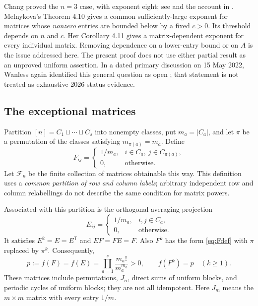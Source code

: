 \documentclass[11pt]{article}
\theoremstyle{remark}\newtheorem{remark}[theorem]{Remark}
\newcommand{\Fset}{\mathcal F_n}
\begin{document}
Chang proved the $n=3$ case, with exponent eight; see \cite{Chang90} and
the account in \cite{Mel}. Melnykova's Theorem 4.10 gives a common
sufficiently-large exponent for matrices whose \emph{nonzero} entries
are bounded below by a fixed $c>0$. Its threshold depends on $n$ and $c$.
Her Corollary 4.11 gives a matrix-dependent exponent for every individual
matrix. Removing dependence on a lower-entry bound or on $A$ is the
issue addressed here. The present proof does not use either partial
result as an unproved uniform assertion. In a dated primary discussion
on 15 May 2022, Wanless again identified this general question as open
\cite{MO}; that statement is not treated as exhaustive 2026 status evidence.

\subsection{The exceptional matrices}
Partition $[n]=C_1\sqcup\cdots\sqcup C_s$ into nonempty classes, put
$m_a=|C_a|$, and let $\pi$ be a permutation of the classes satisfying
$m_{\pi(a)}=m_a$. Define
\begin{equation}\label{eq:Fdef}
 F_{ij}=\begin{cases}1/m_a,&i\in C_a,\ j\in C_{\pi(a)},\\
 0,&\text{otherwise}.
 \end{cases}
\end{equation}
Let $\Fset$ be the finite collection of matrices obtainable this way.
This definition uses a \emph{common partition of row and column labels};
arbitrary independent row and column relabellings do not describe the
same condition for matrix powers.

Associated with this partition is the orthogonal averaging projection
\begin{equation}\label{eq:Edef}
 E_{ij}=\begin{cases}1/m_a,&i,j\in C_a,\\0,&\text{otherwise}.
 \end{cases}
\end{equation}
It satisfies $E^2=E=E^{\mathsf T}$ and $EF=FE=F$. Also $F^k$ has the
form \eqref{eq:Fdef} with $\pi$ replaced by $\pi^k$. Consequently,
\begin{equation}\label{eq:pdef}
 p:=f(F)=f(E)=\prod_{a=1}^s\frac{m_a!}{m_a^{m_a}}>0,
 \qquad f(F^k)=p\quad(k\ge1).
\end{equation}
These matrices include permutations, $J_n$, direct sums of uniform
blocks, and periodic cycles of uniform blocks; they are not all
idempotent. Here $J_m$ means the $m\times m$ matrix with every entry
$1/m$.
\end{document}
